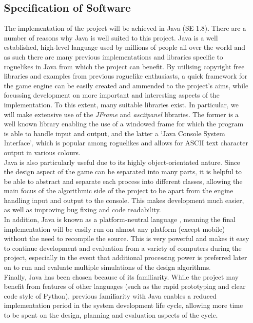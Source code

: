\documentclass[12pt,a4paper]{article}
\begin{document}
\subsection{Specification of Software}

The implementation of the project will be achieved in Java (SE 1.8). There are a number of reasons why Java is well suited to this project. Java is a well established, high-level language used by millions of people all over the world and as such there are many previous implementations and libraries specific to roguelikes in Java from which the project can benefit. By utilising copyright free libraries and examples from previous roguelike enthusiasts, a quick framework for the game engine can be easily created and ammended to the project's aims, while focussing development on more important and interesting aspects of the implementation. To this extent, many suitable libraries exist. In particular, we will make extensive use of the \emph{JFrame} and \emph{asciipanel} libraries. The former is a well known library enabling the use of a windowed frame for which the program is able to handle input and output, and the latter a `Java Console System Interface', which is popular among roguelikes and allows for ASCII text character output in various colours. \\

Java is also particularly useful due to its highly object-orientated nature. Since the design aspect of the game can be separated into many parts, it is helpful to be able to abstract and separate each process into different classes, allowing the main focus of the algorithmic side of the project to be apart from the engine handling input and output to the console. This makes development much easier, as well as improving bug fixing and code readability.\\

In addition, Java is known as a platform-neutral language \cite{java}, meaning the final implementation will be easily run on almost any platform (except mobile) without the need to recompile the source. This is very powerful and makes it easy to continue development and evaluation from a variety of computers during the project, especially in the event that additional processing power is preferred later on to run and evaluate multiple simulations of the design algorithms. \\

Finally, Java has been chosen because of its familiarity. While the project may benefit from features of other languages (such as the rapid prototyping and clear code style of Python), previous familiarity with Java enables a reduced implementation period in the system development life cycle, allowing more time to be spent on the design, planning and evaluation aspects of the cycle. 
\\
\end{document}
